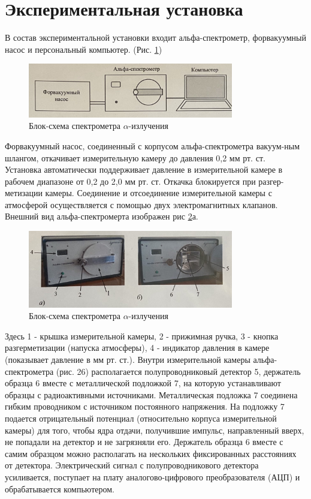 \documentclass[11.5pt,a4paper,russian]{article}
\begin{document}
\section{Экспериментальная установка}
В состав экспериментальной установки входит альфа-спектрометр, форвакуумный насос и персональный компьютер. (Рис. \ref{fig:scheme})

\begin{figure}[h]
  \centering
  \includegraphics[width=0.8\textwidth]{710a8508-9868-4ef0-989c-5313e27d6a45}  \caption{Блок-схема спектрометра $\alpha$-излучения}
  \label{fig:scheme}
\end{figure}

Форвакуумный насос, соединенный с корпусом альфа-спектрометра вакуум-ным шлангом, откачивает измерительную камеру до давления 0,2 мм рт. ст.\\
Установка автоматически поддерживает давление в измерительной камере в рабочем диапазоне от 0,2 до 2,0 мм рт. ст. Откачка блокируется при разгер-метизации камеры. Соединение и отсоединение измерительной камеры с атмосферой осуществляется с помощью двух электромагнитных клапанов.\\
Внешний вид альфа-спектромерта изображен рис \ref{fig:spectrometer}а.

\begin{figure}[h]
  \centering
  \includegraphics[width=0.8\textwidth]{1447354b-08af-499c-9336-bcffb286f7cc}  \caption{Блок-схема спектрометра $\alpha$-излучения}
  \label{fig:spectrometer}
\end{figure}

Здесь 1 - крышка измерительной камеры, 2 - прижимная ручка, 3 - кнопка разгерметизации (напуска атмосферы), 4 - индикатор давления в камере (показывает давление в мм рт. ст.). Внутри измерительной камеры альфа-спектрометра (рис. 26) располагается полупроводниковый детектор 5, держатель образца 6 вместе с металлической подложкой 7, на которую устанавливают образцы с радиоактивными источниками. Металлическая подложка 7 соединена гибким проводником с источником постоянного напряжения. На подложку 7 подается отрицательный потенциал (относительно корпуса измерительной камеры) для того, чтобы ядра отдачи, получившие импульс, направленный вверх, не попадали на детектор и не загрязняли его. Держатель образца 6 вместе с самим образцом можно располагать на нескольких фиксированных расстояниях от детектора. Электрический сигнал с полупроводникового детектора усиливается, поступает на плату аналогово-цифрового преобразователя (АЦП) и обрабатывается компьютером.
\end{document}
